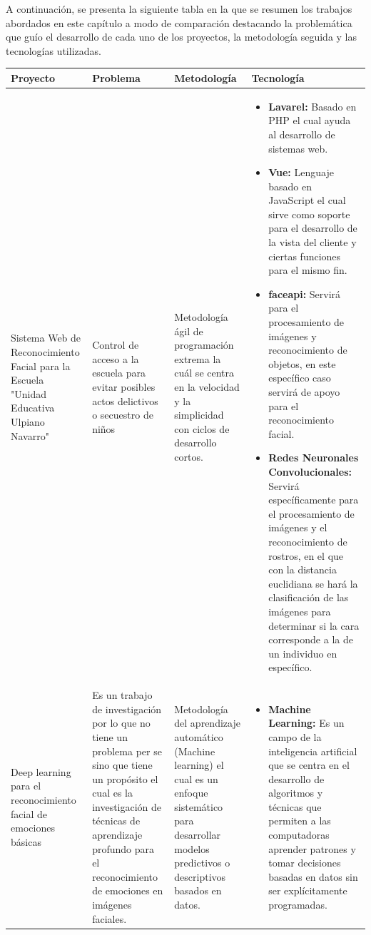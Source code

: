 A continuación, se presenta la siguiente tabla en la que se resumen los trabajos abordados en este capítulo a modo de comparación destacando la problemática que guío el desarrollo de cada uno de los proyectos, la metodología seguida y las tecnologías utilizadas.



\begin{longtable}{|m{3cm}|m{2.5cm}|m{2.5cm}|m{8.5cm}|}
	\hline
	Proyecto & Problema & Metodología & Tecnología \\
	\hline
	\endfirsthead
	\hline
	\endhead
	\hline
	\endfoot
	Sistema Web de Reconocimiento Facial para la Escuela "Unidad Educativa Ulpiano Navarro" & Control de acceso a la escuela para evitar posibles actos delictivos o secuestro de niños & Metodología ágil de programación extrema la cuál se centra en la velocidad y la simplicidad con ciclos de desarrollo cortos. & 
	\begin{itemize} 
		\item \textbf{Lavarel:} Basado en PHP el cual ayuda al desarrollo de sistemas web. 
		\item \textbf{Vue:} Lenguaje basado en JavaScript el cual sirve como soporte para el desarrollo de la vista del cliente y ciertas funciones para el mismo fin. 
		\item \textbf{faceapi:} Servirá para el procesamiento de imágenes y reconocimiento de objetos, en este específico caso servirá de apoyo para el reconocimiento facial. 
		\item \textbf{Redes Neuronales Convolucionales:} Servirá específicamente para el procesamiento de imágenes y el reconocimiento de rostros, en el que con la distancia euclidiana se hará la clasificación de las imágenes para determinar si la cara corresponde a la de un individuo en específico.  
	\end{itemize} \\
	\hline
	Deep learning para el reconocimiento facial de emociones básicas &  Es un trabajo de investigación por lo que no tiene un problema per se sino que tiene un propósito el cual es la investigación de técnicas de aprendizaje profundo para el reconocimiento de emociones en imágenes faciales. & Metodología del aprendizaje automático (Machine learning) el cual es un enfoque sistemático para desarrollar modelos predictivos o descriptivos basados en datos. &
	
	\begin{itemize}
		
		\item \textbf{Machine Learning:}  Es un campo de la inteligencia artificial que se centra en el desarrollo de algoritmos y técnicas que permiten a las computadoras aprender patrones y tomar decisiones basadas en datos sin ser explícitamente programadas.
		

\end{itemize}
\end{longtable}
